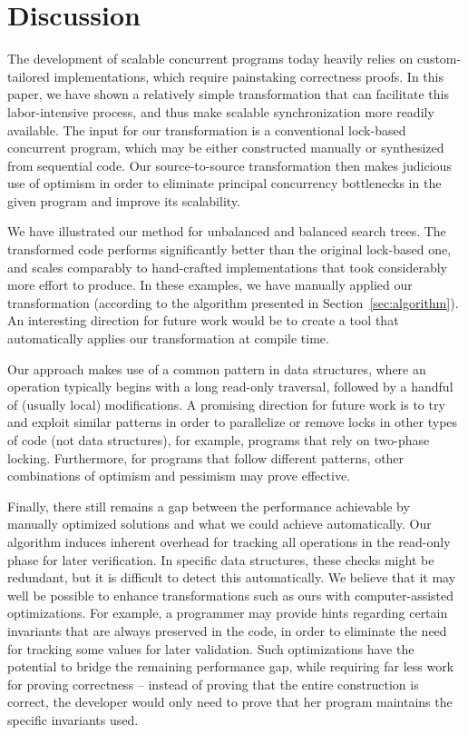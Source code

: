 \section{Discussion}\label{sec:discussion}

The development of scalable concurrent programs today
heavily relies on custom-tailored implementations, which require painstaking correctness proofs.
In this paper, we have shown a relatively simple  transformation that can facilitate this labor-intensive process, and
thus make scalable synchronization more readily available.
The input for our transformation is a conventional lock-based concurrent program, which may be either constructed manually or
synthesized from sequential code. Our source-to-source transformation then makes judicious use of optimism in order to
eliminate principal concurrency bottlenecks in the given program and improve its scalability. 

We have illustrated our method for unbalanced and balanced search trees.
The transformed code performs significantly better than the original
lock-based one, and scales comparably  to hand-crafted
implementations that took considerably more effort to produce.
In these examples, we have manually applied our transformation (according to the algorithm presented in Section~\ref{sec:algorithm}). An interesting direction for future work would be to create a tool that automatically applies our transformation at compile time.

Our approach makes use of a common pattern in data structures, where an operation typically begins with a long read-only traversal, followed by a handful of (usually local) modifications.
A promising direction for future work  is to try and
exploit similar patterns in order to parallelize or remove locks in other types of code (not data structures), for example, programs that rely on two-phase locking.
Furthermore, for programs that follow different patterns, other combinations of optimism and pessimism may prove effective.

Finally, there still remains a gap between the performance achievable by manually optimized solutions and what we could achieve automatically. Our algorithm induces inherent overhead for tracking all operations in the read-only phase for later verification.
In specific data structures, these checks might be redundant, but it is difficult  to detect this automatically. We believe that
it may well be possible to enhance  transformations such as ours with computer-assisted optimizations. For example, a programmer may provide hints regarding certain
invariants that are always preserved in the code, in order to eliminate the need for tracking some values for later
validation. Such optimizations have the potential to bridge the remaining performance gap, while requiring far less work
for proving correctness -- instead of proving that the entire construction is correct, the developer would only need to
prove that her program maintains the specific invariants used.
